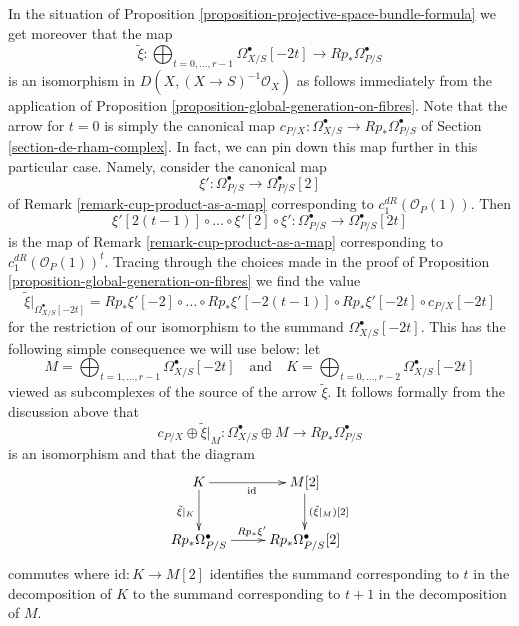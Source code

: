 \begin{remark}
\label{remark-projective-space-bundle-formula}
In the situation of
Proposition \ref{proposition-projective-space-bundle-formula}
we get moreover that the map
$$
\tilde \xi :
\bigoplus\nolimits_{t = 0, \ldots, r - 1}
\Omega^\bullet_{X/S}[-2t]
\longrightarrow
Rp_*\Omega^\bullet_{P/S}
$$
is an isomorphism in $D(X, (X \to S)^{-1}\mathcal{O}_X)$ as follows
immediately from the application of
Proposition \ref{proposition-global-generation-on-fibres}.
Note that the arrow for $t = 0$ is simply the canonical map
$c_{P/X} : \Omega^\bullet_{X/S} \to Rp_*\Omega^\bullet_{P/S}$
of Section \ref{section-de-rham-complex}.
In fact, we can pin down this map further in this particular case.
Namely, consider the canonical map
$$
\xi' : \Omega^\bullet_{P/S} \to \Omega^\bullet_{P/S}[2]
$$
of Remark \ref{remark-cup-product-as-a-map} corresponding to
$c_1^{dR}(\mathcal{O}_P(1))$. Then
$$
\xi'[2(t - 1)] \circ \ldots \circ \xi'[2] \circ \xi' : 
\Omega^\bullet_{P/S} \to \Omega^\bullet_{P/S}[2t]
$$
is the map of Remark \ref{remark-cup-product-as-a-map} corresponding to
$c_1^{dR}(\mathcal{O}_P(1))^t$. Tracing through the choices made in the
proof of Proposition \ref{proposition-global-generation-on-fibres}
we find the value
$$
\tilde \xi|_{\Omega^\bullet_{X/S}[-2t]} =
Rp_*\xi'[-2] \circ \ldots \circ Rp_*\xi'[-2(t - 1)] \circ
Rp_*\xi'[-2t] \circ c_{P/X}[-2t]
$$
for the restriction of our isomorphism to the summand
$\Omega^\bullet_{X/S}[-2t]$. This has the following simple
consequence we will use below: let
$$
M = \bigoplus\nolimits_{t = 1, \ldots, r - 1} \Omega^\bullet_{X/S}[-2t]
\quad\text{and}\quad
K = \bigoplus\nolimits_{t = 0, \ldots, r - 2} \Omega^\bullet_{X/S}[-2t]
$$
viewed as subcomplexes of the source of the arrow $\tilde \xi$.
It follows formally from the discussion above that
$$
c_{P/X} \oplus
\tilde \xi|_M :
\Omega^\bullet_{X/S} \oplus M \longrightarrow
Rp_*\Omega^\bullet_{P/S}
$$
is an isomorphism and that the diagram
$$
\xymatrix{
K \ar[d]_{\tilde \xi|_K} \ar[r]_{\text{id}} &
M[2] \ar[d]^{(\tilde \xi|_M)[2]} \\
Rp_*\Omega^\bullet_{P/S} \ar[r]^{Rp_*\xi'} &
Rp_*\Omega^\bullet_{P/S}[2]
}
$$
commutes where $\text{id} : K \to M[2]$ identifies the summand
corresponding to $t$ in the decomposition of $K$ to the summand
corresponding to $t + 1$ in the decomposition of $M$.
\end{remark}









